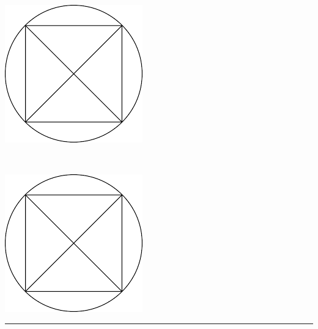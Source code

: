 \begin{center}
    \begin{minipage}{0.2\textwidth}
        \includegraphics[width=0.6\linewidth]{./images/icon1.png}
    \end{minipage}%
    \begin{minipage}{0.59\textwidth}
        \centering
        \unin \\
        \small
        \udepartment
    \end{minipage}%
    \begin{minipage}{0.2\textwidth}
        \raggedleft
        \includegraphics[width=0.68\linewidth]{./images/icon2.png}
    \end{minipage}
    \vspace{5pt} 
    \hrule
\end{center}

